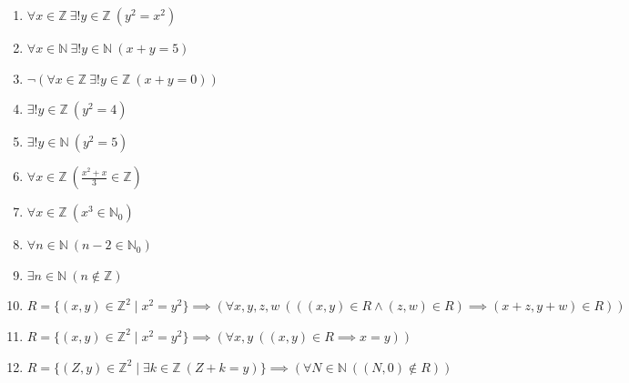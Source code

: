 \documentclass[11pt,a4paper]{article}
\begin{document}
\begin{enumerate}
\item $\displaystyle \forall x \in \mathbb{Z}\ \exists! y \in \mathbb{Z}\ (y^{2} = x^{2})$
\item $\displaystyle \forall x \in \mathbb{N}\ \exists! y \in \mathbb{N}\ (x + y = 5)$
\item $\displaystyle \lnot (\forall x \in \mathbb{Z}\ \exists! y \in \mathbb{Z}\ (x + y = 0))$
\item $\displaystyle \exists! y \in \mathbb{Z}\ (y^{2} = 4)$
\item $\displaystyle \exists! y \in \mathbb{N}\ (y^{2} = 5)$
\item $\displaystyle \forall x \in \mathbb{Z}\ (\frac{x^{2} + x}{3} \in \mathbb{Z})$
\item $\displaystyle \forall x \in \mathbb{Z}\ (x^{3} \in \mathbb{N}_{0})$
\item $\displaystyle \forall n \in \mathbb{N}\ (n - 2 \in \mathbb{N}_{0})$
\item $\displaystyle \exists n \in \mathbb{N}\ (n \notin \mathbb{Z})$
\item $\displaystyle R = \{(x, y) \in \mathbb{Z}^{2} \mid x^{2} = y^{2}\} \implies (\forall x, y, z, w\ (((x, y) \in R \land (z, w) \in R) \implies (x + z, y + w) \in R))$
\item $\displaystyle R = \{(x, y) \in \mathbb{Z}^{2} \mid x^{2} = y^{2}\} \implies (\forall x, y\ ((x, y) \in R \implies x = y))$
\item $\displaystyle R = \{(Z, y) \in \mathbb{Z}^{2} \mid \exists k \in \mathbb{Z}\ (Z + k = y)\} \implies (\forall N \in \mathbb{N}\ ((N, 0) \notin R))$
\end{enumerate}
\end{document}
